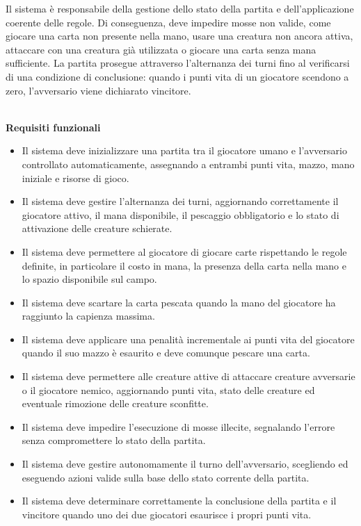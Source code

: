 Il sistema è responsabile della gestione dello stato della partita e
dell'applicazione coerente delle regole. Di conseguenza, deve impedire mosse non
valide, come giocare una carta non presente nella mano, usare una creatura non
ancora attiva, attaccare con una creatura già utilizzata o giocare una carta
senza mana sufficiente. La partita prosegue attraverso l'alternanza dei turni
fino al verificarsi di una condizione di conclusione: quando i punti vita di un
giocatore scendono a zero, l'avversario viene dichiarato vincitore.

\textbf{\\Requisiti funzionali}

\begin{itemize}
    \item Il sistema deve inizializzare una partita tra il giocatore umano e
    l'avversario controllato automaticamente, assegnando a entrambi punti vita,
    mazzo, mano iniziale e risorse di gioco.
    \item Il sistema deve gestire l'alternanza dei turni, aggiornando
    correttamente il giocatore attivo, il mana disponibile, il pescaggio
    obbligatorio e lo stato di attivazione delle creature schierate.
    \item Il sistema deve permettere al
    giocatore di giocare carte rispettando le regole definite, in particolare il
    costo in mana, la presenza della carta nella mano e lo spazio disponibile sul
    campo.
    \item Il sistema deve scartare la carta pescata quando la mano del giocatore
    ha raggiunto la capienza massima.
    \item Il sistema deve applicare una penalità incrementale ai punti vita del
    giocatore quando il suo mazzo è esaurito e deve comunque pescare una carta.
    \item Il sistema deve permettere alle creature attive di attaccare creature
    avversarie o il giocatore nemico, aggiornando punti vita, stato delle
    creature ed eventuale rimozione delle creature sconfitte.
    \item Il sistema deve impedire l'esecuzione di mosse illecite, segnalando
    l'errore senza compromettere lo stato della partita.
    \item Il sistema deve gestire autonomamente il turno dell'avversario,
    scegliendo ed eseguendo azioni valide sulla base dello stato corrente della
    partita.
    \item Il sistema deve determinare correttamente la conclusione della partita
    e il vincitore quando uno dei due giocatori esaurisce i propri punti vita.
\end{itemize}

